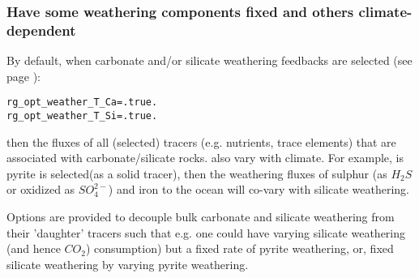 %
\newpage
\subsubsection{Have some weathering components fixed and others climate-dependent}\label{howto:weatheringfeedback2}

\vspace{2mm}
By default, when carbonate and/or silicate weathering feedbacks are selected (see page \pageref{subsec:set_up_a_weathering_feedback}):
\vspace{-2mm}\small\begin{verbatim}
rg_opt_weather_T_Ca=.true.
rg_opt_weather_T_Si=.true.
\end{verbatim}\normalsize\vspace{-2mm}
then the fluxes of all (selected) tracers (e.g. nutrients, trace elements) that are associated with carbonate/silicate rocks. also vary with climate. For example, is pyrite is selected(as a solid tracer), then the weathering fluxes of sulphur (as \(H_{2}S\) or oxidized as \(SO^{2-}_{4}\)) and iron to the ocean will co-vary with silicate weathering.

\vspace{1mm}
Options are provided to decouple bulk carbonate and silicate weathering from their 'daughter' tracers such that e.g. one could have varying silicate weathering (and hence \(CO_{2}\)) consumption) but a fixed rate of pyrite weathering, or, fixed silicate weathering by varying pyrite weathering. 

